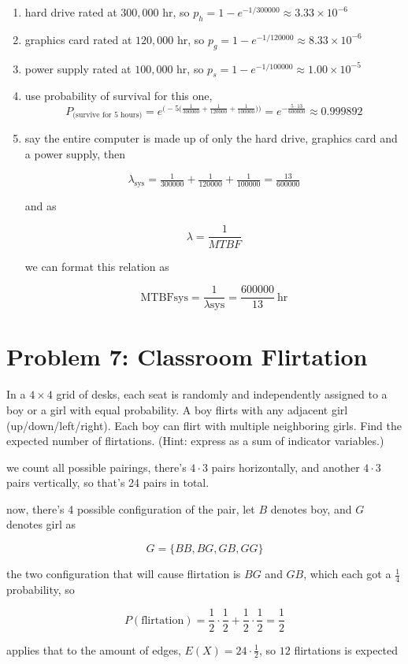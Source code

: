 \begin{enumerate}
\item hard drive rated at $300{,}000$ hr, so $p_h=1-e^{-1/300000}\approx \boxed{3.33\times 10^{-6}}$
\item graphics card rated at $120{,}000$ hr, so $p_g=1-e^{-1/120000}\approx \boxed{8.33\times 10^{-6}}$
\item power supply rated at $100{,}000$ hr, so $p_s=1-e^{-1/100000}\approx \boxed{1.00\times 10^{-5}}$
\item use probability of survival for this one, 
\[
    P_{\text{(survive for 5 hours)}}=e^{\Big(-5\Big(\tfrac{1}{300000}+\tfrac{1}{120000}+\tfrac{1}{100000}\Big)\Big)}
= e^{-\frac{5\cdot 13}{600000}}\approx \boxed{0.999892}
\]
\item say the entire computer is made up of only the hard drive, graphics card and a power supply, then 

    \[\lambda_{\text{sys}}=\tfrac{1}{300000}+\tfrac{1}{120000}+\tfrac{1}{100000}=\tfrac{13}{600000}\]

and as 

\[\lambda = \frac{1}{MTBF}\]

we can format this relation as

\[
    \text{MTBF}{\text{sys}}=\frac{1}{\lambda{\text{sys}}}=\boxed{\frac{600000}{13}\ \text{hr}}
\]
\end{enumerate}
\vspace{1em}
\hrulefill

\section*{Problem 7: Classroom Flirtation}
In a $4 \times 4$ grid of desks, each seat is randomly and independently assigned to a boy or a girl with equal probability. A boy flirts with any adjacent girl (up/down/left/right). Each boy can flirt with multiple neighboring girls. Find the expected number of flirtations. (Hint: express as a sum of indicator variables.)

\medskip
\solution

we count all possible pairings, there's $4 \cdot 3$ pairs horizontally, and another $4 \cdot 3$ pairs vertically, so that's 24 pairs in total. 

\vspace{1em}

now, there's 4 possible configuration of the pair, let $B$ denotes boy, and $G$ denotes girl as 

\[G = \{BB, BG, GB, GG\}\]

the two configuration that will cause flirtation is $BG$ and $GB$, which each got a $\frac14$ probability, so 

\[P(\text{flirtation}) = \frac12\cdot\frac12 + \frac12\cdot\frac12 = \frac12\]

applies that to the amount of edges, $E(X) = 24 \cdot \frac12$, so $\boxed{12}$ flirtations is expected

